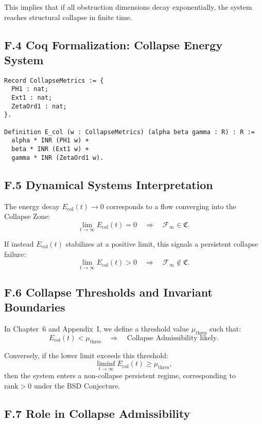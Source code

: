 \documentclass[11pt]{article}
\begin{document}
\noindent
This implies that if all obstruction dimensions decay exponentially, the system reaches structural collapse in finite time.

\subsection*{F.4 Coq Formalization: Collapse Energy System}
\begin{lstlisting}[language=Coq]
Record CollapseMetrics := {
  PH1 : nat;
  Ext1 : nat;
  ZetaOrd1 : nat;
}.

Definition E_col (w : CollapseMetrics) (alpha beta gamma : R) : R :=
  alpha * INR (PH1 w) +
  beta * INR (Ext1 w) +
  gamma * INR (ZetaOrd1 w).
\end{lstlisting}

\subsection*{F.5 Dynamical Systems Interpretation}

The energy decay \( E_{\mathrm{col}}(t) \to 0 \) corresponds to a flow converging into the Collapse Zone:
\[
\lim_{t \to \infty} E_{\mathrm{col}}(t) = 0 \quad \Longrightarrow \quad \mathcal{F}_\infty \in \mathfrak{C}.
\]

If instead \( E_{\mathrm{col}}(t) \) stabilizes at a positive limit, this signals a persistent collapse failure:
\[
\lim_{t \to \infty} E_{\mathrm{col}}(t) > 0 \quad \Rightarrow \quad \mathcal{F}_\infty \notin \mathfrak{C}.
\]

\subsection*{F.6 Collapse Thresholds and Invariant Boundaries}

In Chapter~6 and Appendix~I, we define a threshold value \( \mu_{\mathrm{thres}} \) such that:
\[
E_{\mathrm{col}}(t) < \mu_{\mathrm{thres}} \quad \Rightarrow \quad \text{Collapse Admissibility likely}.
\]

Conversely, if the lower limit exceeds this threshold:
\[
\liminf_{t \to \infty} E_{\mathrm{col}}(t) \geq \mu_{\mathrm{thres}},
\]
then the system enters a non-collapse persistent regime, corresponding to \( \mathrm{rank} > 0 \) under the BSD Conjecture.

\subsection*{F.7 Role in Collapse Admissibility}
\end{document}
